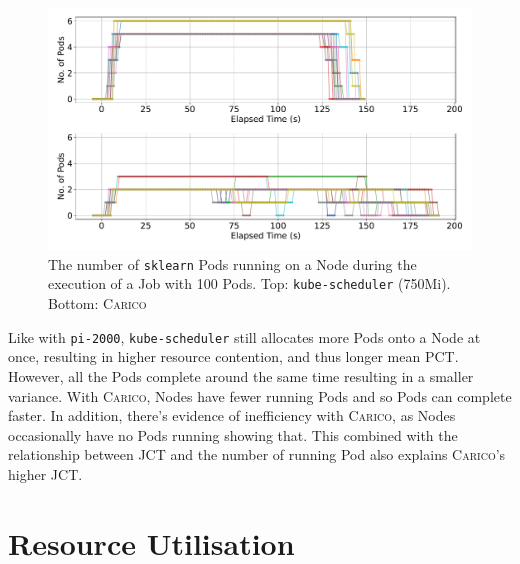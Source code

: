 \begin{figure}[ht!]
    \centering
    \includegraphics[width=\textwidth]{images/ml-running-pods.pdf}
    \caption{The number of \texttt{sklearn} Pods running on a Node during the
    execution of a Job with 100 Pods. Top: \texttt{kube-scheduler} (750Mi).
    Bottom: \textsc{Carico}}
    \label{fig:ml-pod-running}
\end{figure}

Like with \texttt{pi-2000}, \texttt{kube-scheduler} still allocates more Pods
onto a Node at once, resulting in higher resource contention, and thus longer
mean PCT. However, all the Pods complete around the same time resulting in a
smaller variance. With \textsc{Carico}, Nodes have fewer running Pods and so
Pods can complete faster. In addition, there's evidence of inefficiency with
\textsc{Carico}, as Nodes occasionally have no Pods running showing that. This
combined with the relationship between JCT and the number of running Pod also
explains \textsc{Carico}'s higher JCT.
%
%
%
\section{Resource Utilisation}
\label{sec:eval-util}

